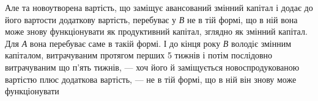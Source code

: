 Але та новоутворена вартість, що заміщує авансований змінний капітал
і додає до його вартости додаткову вартість, перебуває у \emph{В} не в тій
формі, що в ній вона може знову функціонувати як продуктивний капітал,
зглядно як змінний капітал. Для \emph{А} вона перебуває саме в такій формі.
І до кінця року \emph{В} володіє змінним капіталом, витрачуваним протягом
перших 5 тижнів і потім послідовно витрачуваним що п’ять тижнів, — хоч
його й заміщується новоспродукованою вартістю плюс додаткова вартість,
— не в тій формі, що в ній він знову може функціонувати
\parbreak{}  %
